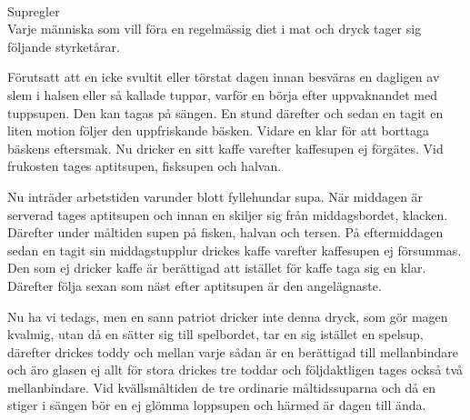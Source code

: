 \documentclass[a6paper, 10pt, twoside]{article}
\begin{document}
\noindent
{}
\vspace{10pt} \\
\Large Supregler\\ %
\small 
Varje människa som vill föra en regelmässig diet i mat och dryck tager sig följande styrketårar.

Förutsatt att en icke svultit eller törstat dagen innan besväras en dagligen av slem i halsen eller så kallade tuppar, varför en börja efter uppvaknandet med tuppsupen. Den kan tagas på sängen. En stund därefter och sedan en tagit en liten motion följer den uppfriskande bäsken. Vidare en klar för att borttaga bäskens eftersmak. Nu dricker en sitt kaffe varefter kaffesupen ej förgätes. Vid frukosten tages aptitsupen, fisksupen och halvan.

Nu inträder arbetstiden varunder blott fyllehundar supa. När middagen är serverad tages aptitsupen och innan en skiljer sig från middagsbordet, klacken. Därefter under måltiden supen på fisken, halvan och tersen. På eftermiddagen sedan en tagit sin middagstupplur drickes kaffe varefter kaffesupen ej försummas. Den som ej dricker kaffe är berättigad att istället för kaffe taga sig en klar. Därefter följa sexan som näst efter aptitsupen är den angelägnaste.

Nu ha vi tedags, men en sann patriot dricker inte denna dryck, som gör magen kvalmig, utan då en sätter sig till spelbordet, tar en sig istället en spelsup, därefter drickes toddy och mellan varje sådan är en berättigad till mellanbindare och äro glasen ej allt för stora drickes tre toddar och följdaktligen tages också två mellanbindare. Vid kvällsmåltiden de tre ordinarie måltidssuparna och då en stiger i sängen bör en ej glömma loppsupen och härmed är dagen till ända. 
\end{document}
